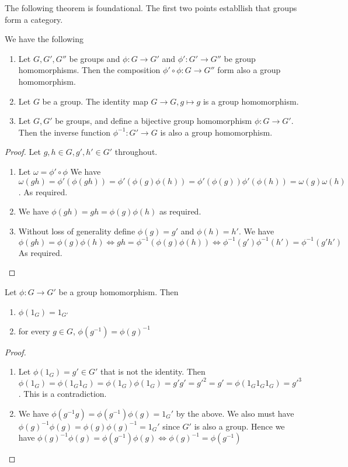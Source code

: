 The following theorem is foundational. The first two points establlish that groups form a
category. 
\begin{theorem} 
  We have the following
  \begin{enumerate}
    \item Let $G,G',G''$ be groups and $\phi:G\to G'$ and $\phi':G'\to G''$ be group
      homomorphisms. Then the composition $\phi'\circ\phi:G\to G''$ form also a group
      homomorphism.
    \item Let $G$ be a group. The identity map $G\to G,g\mapsto g$ is a group
      homomorphism.
    \item Let $G,G'$ be groups, and define a bijective group homomorphism $\phi:G\to G'$.
      Then the inverse function $\phi^{-1}:G'\to G$ is also a group homomorphism.
  \end{enumerate}
  \label{groupsCategories}
\end{theorem}
\begin{proof}
  Let $g,h\in G, g',h'\in G'$ throughout.
  \begin{enumerate}
    \item Let $\omega = \phi' \circ \phi $ We have $\omega(gh)= \phi'(\phi(gh))=
      \phi'(\phi(g)\phi(h)) =\phi'(\phi(g)) \phi'(\phi(h)) = \omega(g)\omega(h) $. As
      required.
    \item We have $\phi(gh) = gh = \phi(g)\phi(h)$ as required.
    \item Without loss of generality define $\phi(g) = g'$ and $\phi(h) = h'$. We have 
    $\phi(gh) = \phi(g)\phi(h) \iff gh = \phi^{-1}(\phi(g)\phi(h)) \iff \phi^{-1}(g')\phi^{-1}(h') = \phi^{-1}(g'h')$ As required.

  \end{enumerate}
\end{proof}

\begin{theorem}
  Let $\phi:G\to G'$ be a group homomorphism. Then
  \begin{enumerate}
    \item $\phi(1_G)=1_{G'}$
    \item for every $g\in G$, $\phi(g^{-1})= \phi(g)^{-1}$
  \end{enumerate}
  \label{homIdInv}
\end{theorem}
\begin{proof}
  \begin{enumerate}
    \item Let $\phi(1_G)=g'\in G'$ that is not the identity. Then $\phi(1_G)=\phi(1_G
      1_G)=\phi(1_G)\phi(1_G)=g'g'=g'^2=g'=\phi(1_G1_G1_G)=g'^3$. This is a contradiction.
    \item We have $\phi(g^{-1}g)=\phi(g^{-1})\phi(g)= 1_G'$ by the above. We also must
      have $\phi(g)^{-1}\phi(g)=\phi(g)\phi(g)^{-1}=1_G'$ since $G'$ is also a group.
      Hence we have $\phi(g)^{-1}\phi(g)=\phi(g^{-1})\phi(g) \iff
      \phi(g)^{-1}=\phi(g^{-1})$
  \end{enumerate}
\end{proof}


